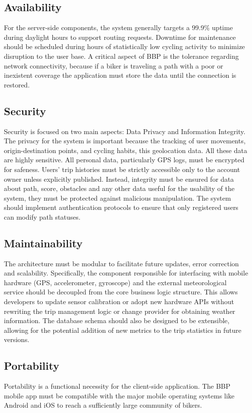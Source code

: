 \subsection{Availability}
For the server-side components, the system generally targets a 99.9\% uptime during daylight hours to support routing requests. Downtime for maintenance should be scheduled during hours 
of statistically low cycling activity to minimize disruption to the user base.
A critical aspect of BBP is the tolerance regarding network connectivity, because if a biker is traveling a path with a poor or inexistent coverage the application must store the data 
until the connection is restored.

\subsection{Security}
Security is focused on two main aspects: Data Privacy and Information Integrity.
The privacy for the system is important because the tracking of user movements, origin-destination points, and cycling habits, this geolocation data. All these data are highly sensitive. 
All personal data, particularly GPS logs, must be encrypted for safeness. Users' trip histories must be strictly accessible only to the account owner unless explicitly published.
Instead, integrity must be ensured for data about path, score, obstacles and any other data useful for the usability of the system, they must be protected against malicious manipulation. 
The system should implement authentication protocols to ensure that only registered users can modify path statuses.

\subsection{Maintainability}
The architecture must be modular to facilitate future updates, error correction and scalability. Specifically, the component responsible for interfacing with mobile hardware 
(GPS, accelerometer, gyroscope) and the external meteorological service should be decoupled from the core business logic structure. This allows developers to update sensor calibration 
or adopt new hardware APIs without rewriting the trip management logic or change provider for obtaining weather information.
The database schema should also be designed to be extensible, allowing for the potential addition of new metrics to the trip statistics in future versions.

\subsection{Portability}
Portability is a functional necessity for the client-side application. The BBP mobile app must be compatible with the major mobile operating systems like Android and iOS to reach a sufficiently large community of bikers.

